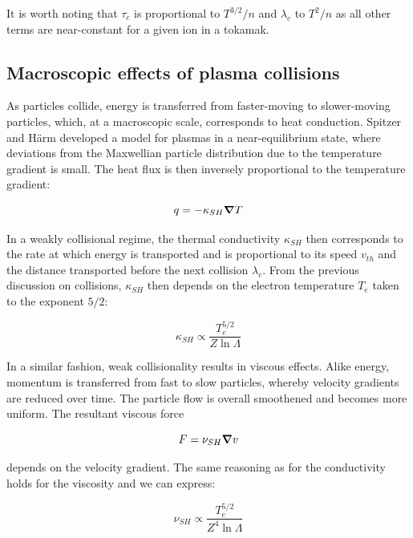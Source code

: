 It is worth noting that $\tau_c$ is proportional to $T^{3/2}/n$ and $\lambda_c$ to $T^2/n$ as all other terms are near-constant for a given ion in a tokamak.


\subsection{Macroscopic effects of plasma collisions}
\label{ssec:intro_macroscopicEffectsPlasma}

As particles collide, energy is transferred from faster-moving to slower-moving particles, which, at a macroscopic scale, corresponds to heat conduction. Spitzer and Härm developed a model for plasmas in a near-equilibrium state\cite{SpitzerResistivity}, where deviations from the Maxwellian particle distribution due to the temperature gradient is small. The heat flux is then inversely proportional to the temperature gradient:

\begin{equation}
	q = -\kappa_{SH} \grad T
\end{equation}

In a weakly collisional regime, the thermal conductivity $\kappa_{SH}$ then corresponds to the rate at which energy is transported and is proportional to its speed $v_{th}$ and the distance transported before the next collision $\lambda_c$. From the previous discussion on collisions, $\kappa_{SH}$ then depends on the electron temperature $T_e$ taken to the exponent $5/2$:

\begin{equation}
	\kappa_{SH} \propto \frac{T_e^{5/2}}{Z \ln \Lambda}
\end{equation}

In a similar fashion, weak collisionality results in viscous effects. Alike energy, momentum is transferred from fast to slow particles, whereby velocity gradients are reduced over time. The particle flow is overall smoothened and becomes more uniform. The resultant viscous force

\begin{equation}
	F = \nu_{SH}\grad v
\end{equation}

depends on the velocity gradient. The same reasoning as for the conductivity holds for the viscosity and we can express:

\begin{equation}
	\nu_{SH} \propto \frac{T_e^{5/2}}{Z^4 \ln \Lambda}
\end{equation}

